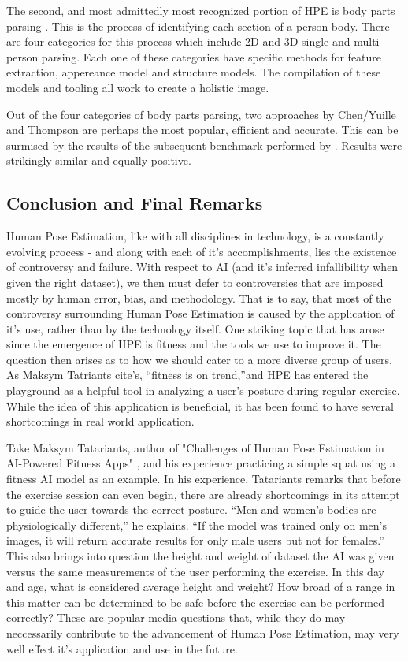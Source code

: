 \documentclass[12pt]{extarticle}
\begin{document}
The second, and most admittedly most recognized portion of HPE is body parts
parsing \cite{LiuZhao2015Asoh}. This is the process of identifying each section
of a person body. There are four categories for this process which include 2D
and 3D single and multi-person parsing. Each one of these categories have
specific methods for feature extraction, appereance model and structure models.
The compilation of these models and tooling all work to create a holistic image.

Out of the four categories of body parts parsing, two approaches by Chen/Yuille
\cite{ChenXianjie2014APEb} and Thompson \cite{TompsonJonathan2014JToa} are
perhaps the most popular, efficient and accurate. This can be surmised by the
results of the subsequent benchmark performed by \cite{LiuZhao2015Asoh}. Results
were strikingly similar and equally positive.

\subsection{Conclusion and Final Remarks}

Human Pose Estimation, like with all disciplines in technology, is a constantly
evolving process - and along with each of it's accomplishments, lies the
existence of controversy and failure. With respect to AI (and it’s inferred
infallibility when given the right dataset), we then must defer to controversies
that are imposed mostly by human error, bias, and methodology. That is to say,
that most of the controversy surrounding Human Pose Estimation is caused by the
application of it’s use, rather than by the technology itself. One striking
topic that has arose since the emergence of HPE is fitness and the tools we use
to improve it. The question then arises as to how we should cater to a more diverse
group of users. As Maksym Tatriants \cite{tatariants_2020} cite’s, “fitness is
on trend,”and HPE has entered the playground as a helpful tool in analyzing a
user’s posture during regular exercise. While the idea of this application is
beneficial, it has been found to have several shortcomings in real world
application.

Take Maksym Tatariants, author of "Challenges of Human Pose Estimation in
AI-Powered Fitness Apps" \cite{tatariants_2020}, and his experience practicing a
simple squat using a fitness AI model as an example. In his experience,
Tatariants remarks that before the exercise session can even begin, there are
already shortcomings in its attempt to guide the user towards the correct
posture. “Men and women's bodies are physiologically different,” he explains.
“If the model was trained only on men's images, it will return accurate results
for only male users but not for females.” This also brings into question the
height and weight of dataset the AI was given versus the same measurements of
the user performing the exercise. In this day and age, what is considered
average height and weight? How broad of a range in this matter can be determined
to be safe before the exercise can be performed correctly? These are popular
media questions that, while they do may neccessarily contribute to the
advancement of Human Pose Estimation, may very well effect it’s application and
use in the future.
\end{document}
